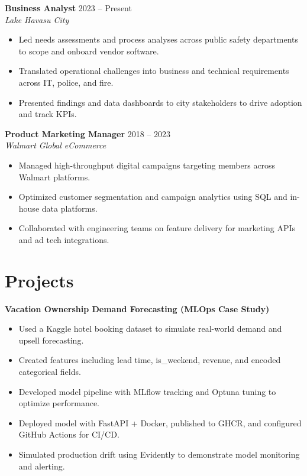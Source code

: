 \documentclass[a4paper,10pt]{article}
\begin{document}
\textbf{Business Analyst} \hfill 2023 -- Present \\
\textit{Lake Havasu City} \\
\begin{itemize}[leftmargin=*]
    \item Led needs assessments and process analyses across public safety departments to scope and onboard vendor software.
    \item Translated operational challenges into business and technical requirements across IT, police, and fire.
    \item Presented findings and data dashboards to city stakeholders to drive adoption and track KPIs.
\end{itemize}

\textbf{Product Marketing Manager} \hfill 2018 -- 2023 \\
\textit{Walmart Global eCommerce} \\
\begin{itemize}[leftmargin=*]
    \item Managed high-throughput digital campaigns targeting members across Walmart platforms.
    \item Optimized customer segmentation and campaign analytics using SQL and in-house data platforms.
    \item Collaborated with engineering teams on feature delivery for marketing APIs and ad tech integrations.
\end{itemize}

\section*{Projects}

\textbf{Vacation Ownership Demand Forecasting (MLOps Case Study)} \\
\begin{itemize}[leftmargin=*]
    \item Used a Kaggle hotel booking dataset to simulate real-world demand and upsell forecasting.
    \item Created features including lead time, is\_weekend, revenue, and encoded categorical fields.
    \item Developed model pipeline with MLflow tracking and Optuna tuning to optimize performance.
    \item Deployed model with FastAPI + Docker, published to GHCR, and configured GitHub Actions for CI/CD.
    \item Simulated production drift using Evidently to demonstrate model monitoring and alerting.
\end{itemize}
\end{document}
